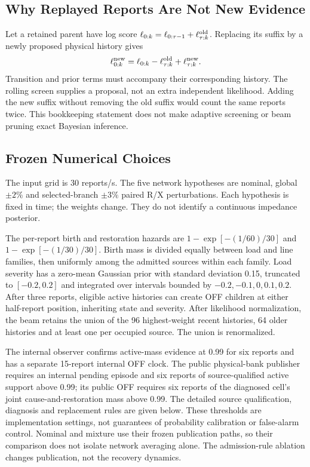 \subsection{Why Replayed Reports Are Not New Evidence}

Let a retained parent have log score
$\ell_{0:k}=\ell_{0:\tau-1}+\ell^{\rm old}_{\tau:k}$.
Replacing its suffix by a newly proposed physical history gives
\begin{equation}
 \ell^{\rm new}_{0:k}
 =\ell_{0:k}-\ell^{\rm old}_{\tau:k}+\ell^{\rm new}_{\tau:k}.
 \label{eq:supp-suffix-replacement}
\end{equation}
Transition and prior terms must accompany their corresponding history.
The rolling screen supplies a proposal, not an extra independent
likelihood. Adding the new suffix without removing the old suffix would
count the same reports twice. This bookkeeping statement does not make
adaptive screening or beam pruning exact Bayesian inference.

\subsection{Frozen Numerical Choices}

The input grid is 30 reports/s. The five network hypotheses are nominal,
global $\pm2\%$ and selected-branch $\pm3\%$ paired R/X perturbations.
Each hypothesis is fixed in time; the weights change. They do not identify
a continuous impedance posterior.

The per-report birth and restoration hazards are
$1-\exp[-(1/60)/30]$ and $1-\exp[-(1/30)/30]$.
Birth mass is divided equally between load and line families, then
uniformly among the admitted sources within each family. Load severity
has a zero-mean Gaussian prior with standard deviation 0.15, truncated to
$[-0.2,0.2]$ and integrated over intervals bounded by
$-0.2,-0.1,0,0.1,0.2$. After three reports, eligible active histories can
create OFF children at either half-report position, inheriting state and
severity. After likelihood normalization, the beam retains the union of
the 96 highest-weight recent histories, 64 older histories and at least
one per occupied source. The union is renormalized.

The internal observer confirms active-mass evidence at 0.99 for six reports
and has a separate 15-report internal OFF clock. The public physical-bank publisher
requires an internal pending episode and six reports of source-qualified
active support above 0.99; its public OFF requires six reports of the
diagnosed cell's joint cause-and-restoration mass above 0.99. The detailed source qualification, diagnosis and replacement rules are
given below.
These thresholds are implementation settings, not guarantees of
probability calibration or false-alarm control. Nominal and mixture use
their frozen publication paths, so their comparison does not isolate
network averaging alone. The admission-rule ablation changes publication,
not the recovery dynamics.


